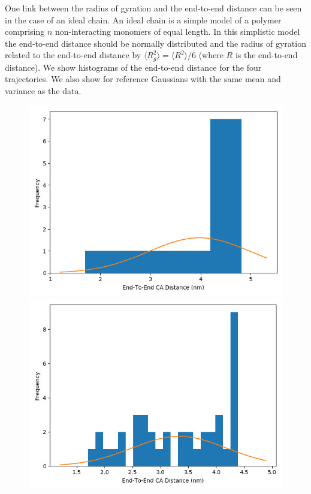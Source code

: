 \documentclass[12pt, onecolumn]{revtex4}    %
\begin{document}
One link between the radius of gyration and the end-to-end distance can be seen in the case of an ideal chain\cite{IdCh}.  An ideal chain is a simple model of a polymer comprising $n$ non-interacting monomers of equal length.  In this simplistic model the end-to-end distance should be normally distributed and the radius of gyration related to the end-to-end distance by $\langle R^2_g \rangle = \langle R^2 \rangle / 6$ (where $R$ is the end-to-end distance)\cite{IdCh}.  We show histograms of the end-to-end distance for the four trajectories.  We also show for reference Gaussians with the same mean and variance as the data.\\

\begin{figure}
\includegraphics[scale=0.33]{E2EH1}
\includegraphics[scale=0.33]{E2EH2}

\end{figure}
\end{document}
